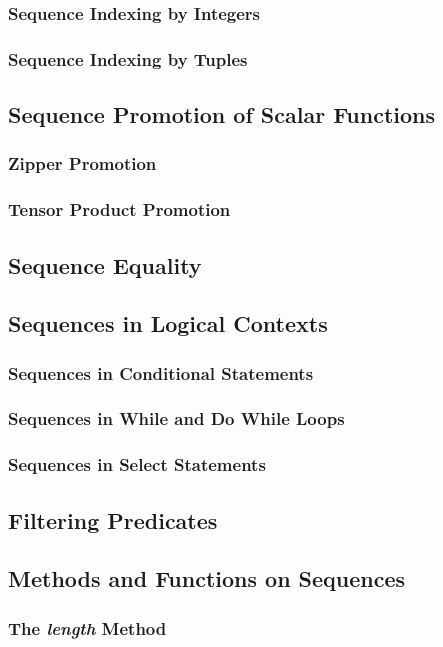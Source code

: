 \documentclass[10pt,twoside,titlepage]{article}
\begin{document}
\subsubsection{Sequence Indexing by Integers}
\subsubsection{Sequence Indexing by Tuples}
\subsection{Sequence Promotion of Scalar Functions}
\subsubsection{Zipper Promotion}
\subsubsection{Tensor Product Promotion}
\subsection{Sequence Equality}
\subsection{Sequences in Logical Contexts}
\subsubsection{Sequences in Conditional Statements}
\subsubsection{Sequences in While and Do While Loops}
\subsubsection{Sequences in Select Statements}
\subsection{Filtering Predicates}
\subsection{Methods and Functions on Sequences}
\subsubsection{The {\em length} Method}
\end{document}
